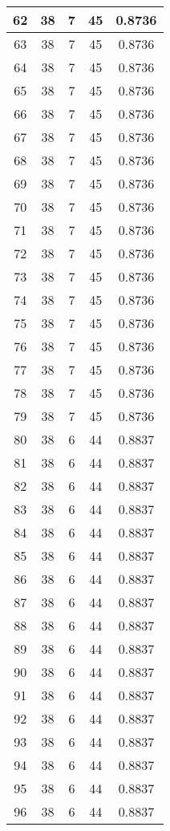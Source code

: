 \documentclass[letterpaper, 12pt]{article}
\begin{document}
\begin{longtable}{|c|c|c|c|c|}
\hline
62 & 38 & 7 & 45 & 0.8736 \\
\hline
63 & 38 & 7 & 45 & 0.8736 \\
\hline
64 & 38 & 7 & 45 & 0.8736 \\
\hline
65 & 38 & 7 & 45 & 0.8736 \\
\hline
66 & 38 & 7 & 45 & 0.8736 \\
\hline
67 & 38 & 7 & 45 & 0.8736 \\
\hline
68 & 38 & 7 & 45 & 0.8736 \\
\hline
69 & 38 & 7 & 45 & 0.8736 \\
\hline
70 & 38 & 7 & 45 & 0.8736 \\
\hline
71 & 38 & 7 & 45 & 0.8736 \\
\hline
72 & 38 & 7 & 45 & 0.8736 \\
\hline
73 & 38 & 7 & 45 & 0.8736 \\
\hline
74 & 38 & 7 & 45 & 0.8736 \\
\hline
75 & 38 & 7 & 45 & 0.8736 \\
\hline
76 & 38 & 7 & 45 & 0.8736 \\
\hline
77 & 38 & 7 & 45 & 0.8736 \\
\hline
78 & 38 & 7 & 45 & 0.8736 \\
\hline
79 & 38 & 7 & 45 & 0.8736 \\
\hline
80 & 38 & 6 & 44 & 0.8837 \\
\hline
81 & 38 & 6 & 44 & 0.8837 \\
\hline
82 & 38 & 6 & 44 & 0.8837 \\
\hline
83 & 38 & 6 & 44 & 0.8837 \\
\hline
84 & 38 & 6 & 44 & 0.8837 \\
\hline
85 & 38 & 6 & 44 & 0.8837 \\
\hline
86 & 38 & 6 & 44 & 0.8837 \\
\hline
87 & 38 & 6 & 44 & 0.8837 \\
\hline
88 & 38 & 6 & 44 & 0.8837 \\
\hline
89 & 38 & 6 & 44 & 0.8837 \\
\hline
90 & 38 & 6 & 44 & 0.8837 \\
\hline
91 & 38 & 6 & 44 & 0.8837 \\
\hline
92 & 38 & 6 & 44 & 0.8837 \\
\hline
93 & 38 & 6 & 44 & 0.8837 \\
\hline
94 & 38 & 6 & 44 & 0.8837 \\
\hline
95 & 38 & 6 & 44 & 0.8837 \\
\hline
96 & 38 & 6 & 44 & 0.8837 \\

\end{longtable}
\end{document}
